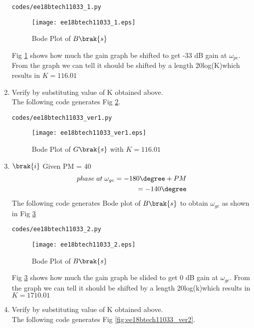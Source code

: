 \begin{enumerate}[label=\thesubsection.\arabic*.,ref=\thesubsection.\theenumi]
\begin{lstlisting}
codes/ee18btech11033_1.py
\end{lstlisting}

\begin{figure}[!ht]
\centering
\texttt{[image: ee18btech11033\_1.eps]}
\caption{Bode Plot of $B\brak{s}$}
\label{fig:ee18btech11033_1}
\end{figure}
Fig \ref{fig:ee18btech11033_1} shows how much the gain graph be shifted to get -33 dB gain at $\omega_{pc}$.
From the graph we can tell it should be shifted by a length 20log(K)which results in $K = 116.01$
\item Verify by substituting value of K obtained above. 
\\
\solution The following code generates Fig \ref{fig:ee18btech11033_ver1}.

\begin{lstlisting}
codes/ee18btech11033_ver1.py
\end{lstlisting}

\begin{figure}[!ht]
\centering
\texttt{[image: ee18btech11033\_ver1.eps]}
\caption{Bode Plot of $G\brak{s}$ with $K=116.01$ }
\label{fig:ee18btech11033_ver1}
\end{figure}

\item $\brak{i}$ Given PM = 40\degree
\\
\solution
\begin{align}
    phase\; at\; \omega_{gc} = -180\degree + PM
    \\
    = -140\degree
\end{align}
The following code generates Bode plot of $B\brak{s}$ to obtain $\omega_{gc}$ as shown in Fig \ref{fig:ee18btech11033_2}

\begin{lstlisting}
codes/ee18btech11033_2.py
\end{lstlisting}

\begin{figure}[!ht]
\centering
\texttt{[image: ee18btech11033\_2.eps]}
\caption{Bode Plot of $B\brak{s}$}
\label{fig:ee18btech11033_2}
\end{figure}
Fig \ref{fig:ee18btech11033_2} shows how much the gain graph be slided to get 0 dB gain at $\omega_{gc}$.
From the graph we can tell it should be shifted by a length 20log(k)which results in  $K =1710.01$ 
\item Verify by substituting value of K obtained above. 
\\
\solution The following code generates Fig \ref{fig:ee18btech11033_ver2}.


\end{enumerate}
